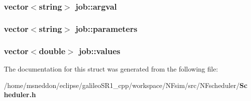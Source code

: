 \subsubsection{\setlength{\rightskip}{0pt plus 5cm}vector$<$string$>$ {\bf job::argval}}\label{structjob_1172cbabdb3950cb2360886dc26f4b43}


\subsubsection{\setlength{\rightskip}{0pt plus 5cm}vector$<$string$>$ {\bf job::parameters}}\label{structjob_7fd43ef19b9dce37cfa4c2f8be1ea7b4}


\subsubsection{\setlength{\rightskip}{0pt plus 5cm}vector$<$double$>$ {\bf job::values}}\label{structjob_b4c342e85c9ed6a16654f7d78ebb1b9a}




The documentation for this struct was generated from the following file:\begin{CompactItemize}
\item 
/home/msneddon/eclipse/galileoSR1\_\-cpp/workspace/NFsim/src/NFscheduler/{\bf Scheduler.h}\end{CompactItemize}
